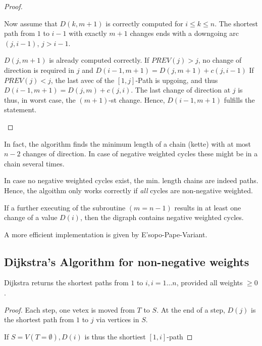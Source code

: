 \begin{proof}
\begin{itemize}
Now assume that $D(k, m+1)$ is correctly computed for $i \leq k \leq n$. The
shortest path from $1$ to $i-1$ with exactly $m+1$ changes ends with a
downgoing arc $(j, i-1)$, $j > i-1$.

$D(j, m+1)$ is already computed correctly. If $PREV(j) > j$, no change of
direction is required in $j$ and $D(i-1, m+1) = D(j, m+1) + c(j,i-1)$
If $PREV(j) < j$, the last avec of the $[1,j]$-Path is upgoing, and thus $D(i-1,m+1)=D(j,m)+c(j,i)$. The last change of direction at $j$ is thus, in worst case, the $(m+1)$-st change. Hence, $D(i-1,m+1)$ fulfills the statement. 
\end{itemize}
\end{proof}

\begin{rem}
In fact, the algorithm finds the minimum length of a chain (kette) with at most $n-2$ changes of direction. In case of negative weighted cycles these might be in a chain several times. 

In case no negative weighted cycles exist, the min. length chains are indeed paths. Hence, the algoithm only works correctly if \emph{all} cycles are non-negative weighted.
\end{rem}

\begin{rem}
If a further executing of the subroutine $(m=n-1)$ results in at least one change of a value $D(i)$, then the digraph contains negative weighted cycles.
\end{rem}

\begin{rem}
A more efficient implementation is given by E'sopo-Pape-Variant.
\end{rem}

\subsection*{Dijkstra's Algorithm for non-negative weights}

\begin{thm}
Dijkstra returns the shortest paths from $1$ to $i, i= 1 … n$, provided all weights $\geq 0$.
\end{thm}

\begin{proof}
Each step, one vetex is moved from $T$ to $S$. At the end of a step, $D(j)$ is the shortest path from $1$ to $j$ via vertices in $S$. 

If $S=V (T= \emptyset), D(i)$ is thus the shortiest $[1,i]$-path
\end{proof}
